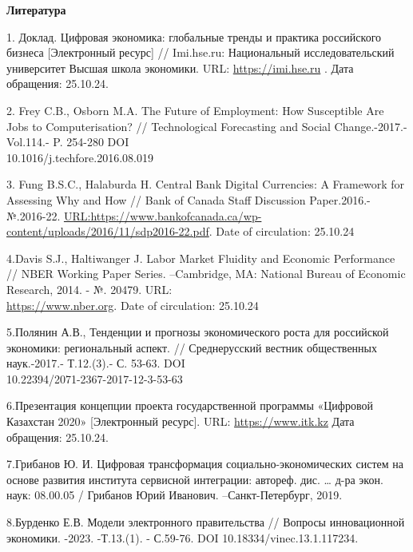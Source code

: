 \begin{center}
{\bfseries Литература}
\end{center}

\begin{references}
1. Доклад. Цифровая экономика: глобальные тренды и практика российского
бизнеса {[}Электронный ресурс{]} // Imi.hse.ru: Национальный
исследовательский университет Высшая школа экономики. URL:
\href{https://imi.hse.ru/pr2017_1}{https://imi.hse.ru} . Дата обращения: 25.10.24.

2. Frey C.B., Osborn M.A. The Future of Employment: How Susceptible Are
Jobs to Computerisation? // Technological Forecasting and Social
Change.-2017.-Vol.114.- P. 254-280
DOI \\10.1016/j.techfore.2016.08.019

3. Fung B.S.C., Halaburda H. Central Bank Digital Currencies: A Framework
for Assessing Why and How // Bank of Canada Staff Discussion
Paper.2016.-№.2016-22.
\href{url:https://www.bankofcanada.ca/wp-content/uploads/2016/11/sdp2016-22.pdf}{URL:https://www.bankofcanada.ca/wp-content/uploads/2016/11/sdp2016-22.pdf}. Date of circulation: 25.10.24

4.Davis S.J., Haltiwanger J. Labor Market Fluidity and Economic
Performance // NBER Working Paper Series. --Cambridge, MA: National
Bureau of Economic Research, 2014. - №. 20479. URL:\\
\href{https://www.nber.org/system/files/working_papers/w20479/w20479.pdf}{https://www.nber.org}.
Date of circulation: 25.10.24

5.Полянин А.В., Тенденции и прогнозы экономического роста для российской
экономики: региональный аспект. // Среднерусский вестник общественных
наук.-2017.- Т.12.(3).- С. 53-63. DOI \\10.22394/2071-2367-2017-12-3-53-63

6.Презентация концепции проекта государственной программы «Цифровой
Казахстан 2020» {[}Электронный ресурс{]}. URL:
\href{https://www.itk.kz/doc/images/Digital\_Kazakhstan.pdf}{https://www.itk.kz} Дата обращения:
25.10.24.

7.Грибанов Ю. И. Цифровая трансформация социально-экономических систем
на основе развития института сервисной интеграции: автореф. дис.
\ldots{} д-ра экон. наук: 08.00.05 / Грибанов Юрий Иванович.
--Санкт-Петербург, 2019.

8.Бурденко Е.В. Модели электронного правительства // Вопросы
инновационной экономики. -2023. -Т.13.(1). - С.59-76. DOI
10.18334/vinec.13.1.117234.


\end{references}
